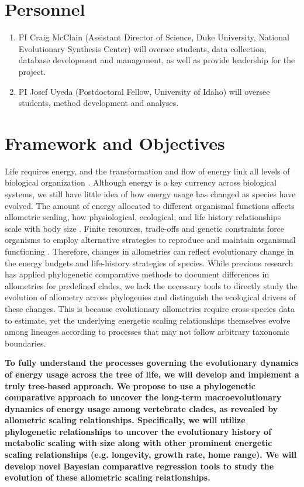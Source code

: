 \documentclass[10pt, a4paper]{article}
\begin{document}
\section*{Personnel}
\begin{enumerate} 
\item PI Craig McClain (Assistant Director of Science, Duke University, National Evolutionary Synthesis Center) will oversee students, data collection, database development and management, as well as provide leadership for the project.
\item PI Josef Uyeda (Postdoctoral Fellow, University of Idaho) will oversee students, method development and analyses.
\end{enumerate}
\clearpage
\section*{Framework and Objectives}
Life requires energy, and the transformation and flow of energy link all levels of biological organization \cite{McClain2012}. Although energy is a key currency across biological systems, we still have little idea of how energy usage has changed as species have evolved. The amount of energy allocated to different organismal functions affects allometric scaling, how physiological, ecological, and life history relationships scale with body size \cite{Peters1983, Calder1984}. Finite resources, trade-offs and genetic constraints force organisms to employ alternative strategies to reproduce and maintain organismal functioning \cite{McClain2014}. Therefore, changes in allometries can reflect evolutionary change in the energy budgets and life-history strategies of species. While previous research has applied phylogenetic comparative methods to document differences in allometries for predefined clades, we lack the necessary tools to directly study the evolution of allometry across phylogenies and distinguish the ecological drivers of these changes. This is because evolutionary allometries require cross-species data to estimate, yet the underlying energetic scaling relationships themselves evolve among lineages according to processes that may not follow arbitrary taxonomic boundaries.  \

\textbf{To fully understand the processes governing the evolutionary dynamics of energy usage across the tree of life, we will develop and implement a truly tree-based approach.  We propose to use a phylogenetic comparative approach to uncover the long-term macroevolutionary dynamics of energy usage among vertebrate clades, as revealed by allometric scaling relationships. Specifically, we will utilize phylogenetic relationships to uncover the evolutionary history of metabolic scaling with size along with other prominent energetic scaling relationships (e.g. longevity, growth rate, home range). We will develop novel Bayesian comparative regression tools to study the evolution of these allometric scaling relationships.}
\end{document}
